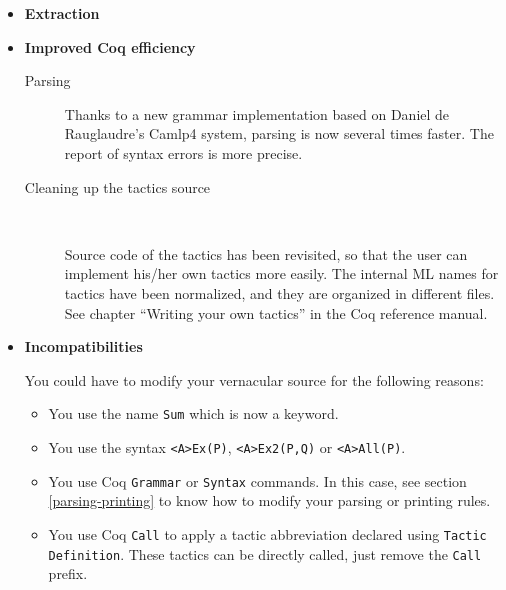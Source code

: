 \documentclass[11pt]{article}
\begin{document}
\begin{itemize}
\item \textbf{Extraction}


\item \textbf{Improved Coq efficiency}

  \begin{description}

  \item[Parsing]

 Thanks to a new grammar implementation based on Daniel de
  Rauglaudre's Camlp4 system, parsing is now several times faster. The
  report of syntax errors is more precise.

  \item[Cleaning up the tactics source]{\ 

  Source code of the tactics has been revisited, so that the user can
    implement his/her own tactics more easily. The internal ML names
    for tactics have been normalized, and they are organized in
    different files. See chapter ``Writing your own tactics'' in the
    Coq reference manual.}

  \end{description}

\item \textbf{Incompatibilities}

  You could have to modify your vernacular source for the following
  reasons:

  \begin{itemize}
 
  \item You use the name \texttt{Sum} which is now a keyword.
  \item You use the syntax \texttt{<A>Ex(P)}, \texttt{<A>Ex2(P,Q)} or 
        \texttt{<A>All(P)}. 

  \item You use Coq \texttt{Grammar} or \texttt{Syntax} commands. 
  In this case, see section
  \ref{parsing-printing} to know how to modify your parsing or printing
  rules.

  \item You use Coq \texttt{Call} to apply a tactic abbreviation
    declared using \texttt{Tactic Definition}. These tactics can be
    directly called, just remove the \texttt{Call} prefix.


\end{itemize}
\end{itemize}
\end{document}
